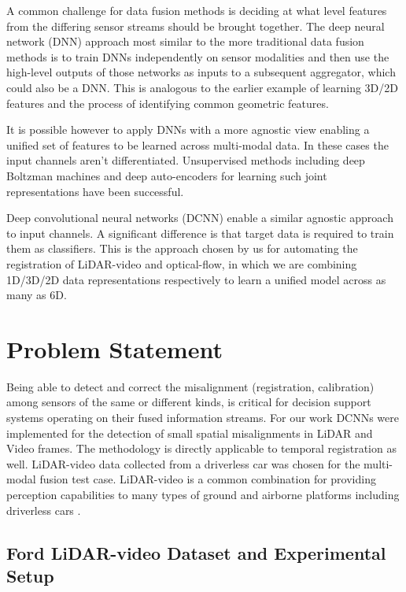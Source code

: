 \documentclass{article}
\begin{document}
A common challenge for data fusion methods is deciding at what level features from the differing sensor streams should be brought together. The deep neural network (DNN) approach most similar to the more traditional data fusion methods is to train DNNs independently on sensor modalities and then use the high-level outputs of those networks as inputs to a subsequent aggregator, which could also be a DNN. This is analogous to the earlier example of learning 3D/2D features and the process of identifying common geometric features. 

It is possible however to apply DNNs with a more agnostic view enabling a unified set of features to be learned across multi-modal data. In these cases the input channels aren't differentiated. Unsupervised methods including deep Boltzman machines and deep auto-encoders for learning such joint representations have been successful.  

Deep convolutional neural networks (DCNN) enable a similar agnostic approach to input channels. A significant difference is that target data is required to train them as classifiers. This is the approach chosen by us for automating the registration of LiDAR-video and optical-flow, in which we are combining 1D/3D/2D data representations respectively to learn a unified model across as many as 6D. 




\section{Problem Statement} %
\label{sec:problem_statement}

Being able to detect and correct the misalignment (registration, calibration) among sensors of the same or different kinds, is critical for decision support systems operating on their fused information streams. For our work DCNNs were implemented for the detection of small spatial misalignments in LiDAR and Video frames. The methodology is directly applicable to temporal registration as well. LiDAR-video data collected from a driverless car was chosen for the multi-modal fusion test case. LiDAR-video is a common combination for providing perception capabilities to many types of ground and airborne platforms including driverless cars \cite{Thrun2011Googles-dr}. 

\subsection{Ford LiDAR-video Dataset and Experimental Setup} %
\label{sub:ford_lidar_video_dataset_and_experimental_setup}
\end{document}
